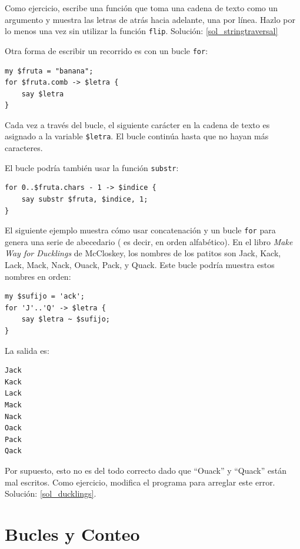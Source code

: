 Como ejercicio, escribe una función que toma una cadena de 
texto como un argumento y muestra las letras de atrás hacia
adelante, una por línea. Hazlo por lo menos una vez sin utilizar
la función {\tt flip}. Solución: \ref{sol_stringtraversal}

Otra forma de escribir un recorrido es con un bucle {\tt for}:

\begin{lstlisting}
my $fruta = "banana";
for $fruta.comb -> $letra {
    say $letra
}
\end{lstlisting}
%

Cada vez a través del bucle, el siguiente carácter en la
cadena de texto es asignado a la variable {\tt \$letra}.
El bucle continúa hasta que no hayan más caracteres.

El bucle podría también usar la función {\tt substr}:

\begin{lstlisting}
for 0..$fruta.chars - 1 -> $indice {
    say substr $fruta, $indice, 1;
}
\end{lstlisting}
%


El siguiente ejemplo muestra cómo usar concatenación y
un bucle {\tt for} para genera una serie de abecedario (
es decir, en orden alfabético). En el libro 
{\em Make Way for Ducklings} de McCloskey, los nombres de los
patitos son Jack, Kack, Lack, Mack, Nack, Ouack, Pack, y Quack. 
Este bucle podría muestra estos nombres en orden:

\begin{lstlisting}
my $sufijo = 'ack';
for 'J'..'Q' -> $letra {
    say $letra ~ $sufijo;
}
\end{lstlisting}
%
La salida es:

\begin{lstlisting}
Jack
Kack
Lack
Mack
Nack
Oack
Pack
Qack
\end{lstlisting}
%
Por supuesto, esto no es del todo correcto dado que ``Ouack'' y 
``Quack'' están mal escritos. Como ejercicio, modifica el programa
para arreglar este error. Solución: \ref{sol_ducklings}.


\section{Bucles y Conteo}
\label{counter}

